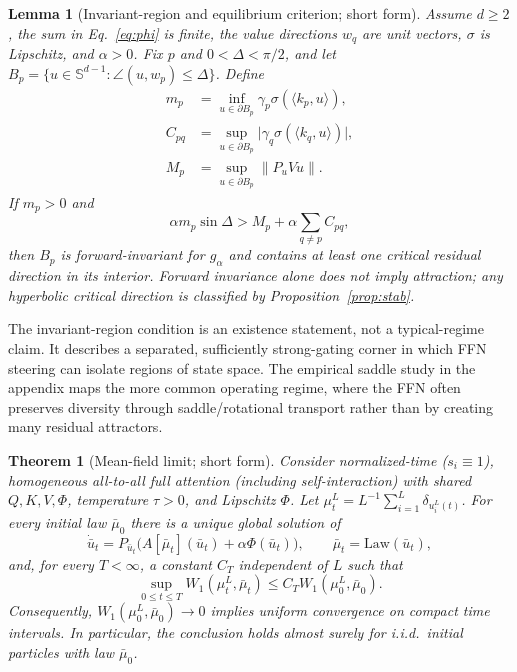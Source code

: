 \documentclass[11pt]{article}
\newtheorem{theorem}{Theorem}
\newtheorem{lemma}{Lemma}
\newcommand{\Sph}{\mathbb{S}}
\begin{document}
\begin{lemma}[Invariant-region and equilibrium criterion; short form]\label{lem:basin}
Assume $d\ge2$, the sum in Eq.~\eqref{eq:phi} is finite, the value directions $w_q$ are
unit vectors, $\sigma$ is Lipschitz, and $\alpha>0$. Fix $p$ and
$0<\Delta<\pi/2$, and let
$B_p=\{u\in\Sph^{d-1}:\angle(u,w_p)\le\Delta\}$. Define
\[
\begin{aligned}
m_p
&=\inf_{u\in\partial B_p}
  \gamma_p\sigma(\langle k_p,u\rangle),\\
C_{pq}
&=\sup_{u\in\partial B_p}
  \bigl|\gamma_q\sigma(\langle k_q,u\rangle)\bigr|,\\
M_p
&=\sup_{u\in\partial B_p}\|P_uVu\|.
\end{aligned}
\]
If $m_p>0$ and
\begin{equation}
\alpha m_p\sin\Delta>M_p+\alpha\sum_{q\ne p}C_{pq},
\label{eq:inward}
\end{equation}
then $B_p$ is forward-invariant for $g_\alpha$ and contains at least one critical
residual direction in its interior. Forward invariance alone does not imply
attraction; any hyperbolic critical direction is classified by
Proposition~\ref{prop:stab}.
\end{lemma}
The invariant-region condition is an existence statement, not a typical-regime
claim. It describes a separated, sufficiently strong-gating corner in which FFN
steering can isolate regions of state space. The empirical saddle study in the
appendix maps the more common operating regime, where the FFN often
preserves diversity through saddle/rotational transport rather than by creating many
residual attractors.
\begin{theorem}[Mean-field limit; short form]\label{thm:mf}
Consider normalized-time ($s_i\equiv1$), homogeneous all-to-all full attention
(including self-interaction) with shared
$Q,K,V,\Phi$, temperature $\tau>0$, and Lipschitz $\Phi$. Let
$\mu_t^L=L^{-1}\sum_{i=1}^L\delta_{u_i^L(t)}$. For every initial law
$\bar\mu_0$ there is a unique global solution of
\begin{equation}
\dot{\bar u}_t=P_{\bar u_t}\big(A[\bar\mu_t](\bar u_t)+\alpha\Phi(\bar u_t)\big),
\qquad \bar\mu_t=\mathrm{Law}(\bar u_t),
\label{eq:mckean}
\end{equation}
and, for every $T<\infty$, a constant $C_T$ independent of $L$ such that
\[
\sup_{0\le t\le T}W_1(\mu_t^L,\bar\mu_t)
\le C_T W_1(\mu_0^L,\bar\mu_0).
\]
Consequently, $W_1(\mu_0^L,\bar\mu_0)\to0$ implies uniform convergence on
compact time intervals. In particular, the conclusion holds almost surely for
i.i.d.\ initial particles with law $\bar\mu_0$.
\end{theorem}
\end{document}

